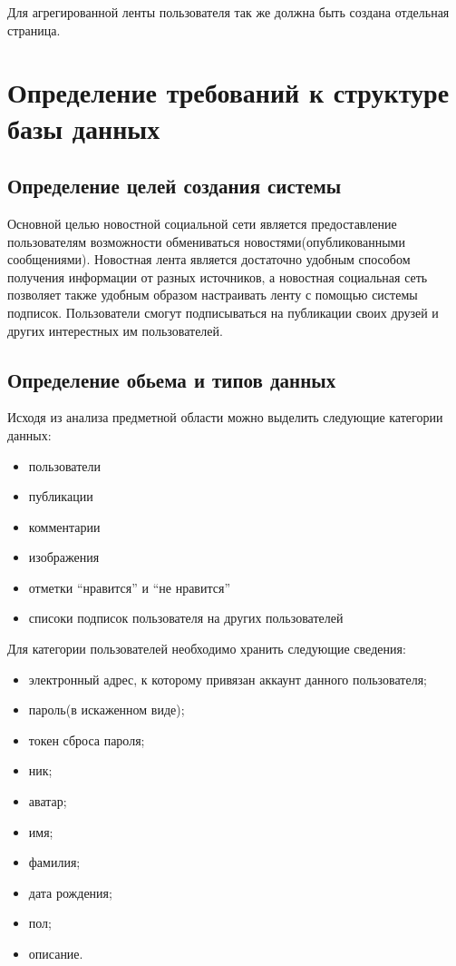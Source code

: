Для агрегированной ленты пользователя так же должна быть создана 
отдельная страница.

\section{Определение требований к структуре базы данных}

\subsection{Определение целей создания системы}

Основной целью новостной социальной сети является предоставление пользователям
возможности обмениваться новостями(опубликованными сообщениями).
Новостная лента является достаточно удобным способом получения информации
от разных источников,
а новостная социальная сеть позволяет также удобным образом настраивать
ленту с помощью системы подписок.
Пользователи смогут подписываться на публикации своих друзей и других интерестных
им пользователей. 

\subsection{Определение обьема и типов данных}

Исходя из анализа предметной области можно выделить следующие категории данных:
\begin{itemize}
\item пользователи
\item публикации
\item комментарии
\item изображения
\item отметки ``нравится'' и ``не нравится''
\item списоки подписок пользователя на других пользователей
\end{itemize}

Для категории пользователей необходимо хранить следующие сведения:
\begin{itemize}
\item электронный адрес, к которому привязан аккаунт данного пользователя;
\item пароль(в искаженном виде);
\item токен сброса пароля;
\item ник;
\item аватар;
\item имя;
\item фамилия;
\item дата рождения;
\item пол;
\item описание.
\end{itemize}



